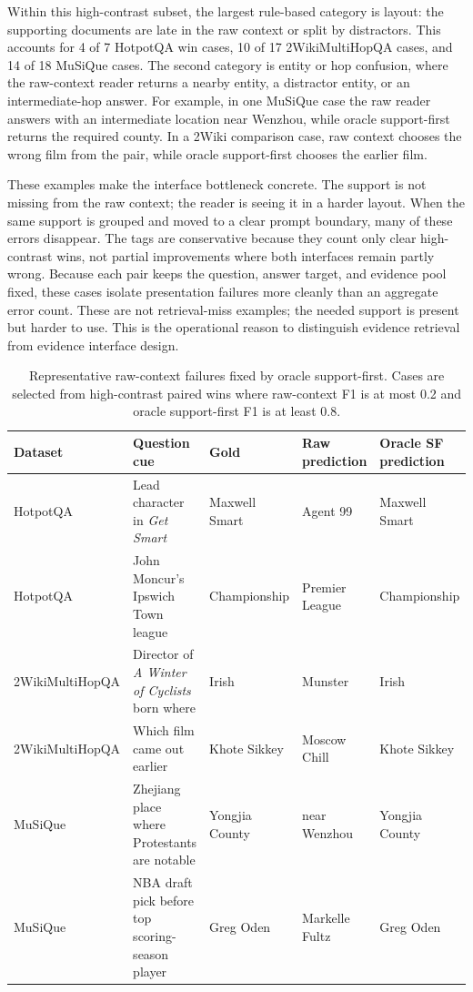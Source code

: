 \documentclass[a4paper,fleqn]{cas-sc}
\begin{document}
Within this high-contrast subset, the largest rule-based category is layout:
the supporting documents are late in the raw context or split by distractors.
This accounts for 4 of 7 HotpotQA win cases, 10 of 17 2WikiMultiHopQA cases,
and 14 of 18 MuSiQue cases. The second category is entity or hop confusion,
where the raw-context reader returns a nearby entity, a distractor entity, or
an intermediate-hop answer. For example, in one MuSiQue case the raw reader
answers with an intermediate location near Wenzhou, while oracle support-first returns
the required county. In a 2Wiki comparison case, raw context chooses the wrong
film from the pair, while oracle support-first chooses the earlier film.

These examples make the interface bottleneck concrete. The support is not
missing from the raw context; the reader is seeing it in a harder layout. When
the same support is grouped and moved to a clear prompt boundary, many of these
errors disappear. The tags are conservative because they count only clear
high-contrast wins, not partial improvements where both interfaces remain
partly wrong. Because each pair keeps the question, answer target, and evidence
pool fixed, these cases isolate presentation failures more cleanly than an
aggregate error count. These are not retrieval-miss examples; the needed support
is present but harder to use. This is the operational reason to distinguish
evidence retrieval from evidence interface design.

\begin{table}[!b]
\centering
\caption{Representative raw-context failures fixed by oracle support-first.
Cases are selected from high-contrast paired wins where raw-context F1 is at
most 0.2 and oracle support-first F1 is at least 0.8.}
\label{tab:error-examples}
\scriptsize
\setlength{\tabcolsep}{3pt}
\begin{tabular}{p{}p{}p{}p{}p{}}
\toprule
Dataset & Question cue & Gold & Raw prediction & Oracle SF prediction \\
\midrule
HotpotQA & Lead character in \emph{Get Smart} & Maxwell Smart & Agent 99 & Maxwell Smart \\
HotpotQA & John Moncur's Ipswich Town league & Championship & Premier League & Championship \\
2WikiMultiHopQA & Director of \emph{A Winter of Cyclists} born where & Irish & Munster & Irish \\
2WikiMultiHopQA & Which film came out earlier & Khote Sikkey & Moscow Chill & Khote Sikkey \\
MuSiQue & Zhejiang place where Protestants are notable & Yongjia County & near Wenzhou & Yongjia County \\
MuSiQue & NBA draft pick before top scoring-season player & Greg Oden & Markelle Fultz & Greg Oden \\
\bottomrule
\end{tabular}
\end{table}
\end{document}
